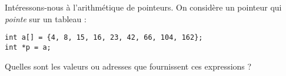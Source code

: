 \documentclass[french,a4paper,addpoints,11pt]{exam}
\begin{document}
\begin{questions}
\clearpage
\question Intéressons-nous à l'arithmétique de pointeurs. On considère  un pointeur qui \emph{pointe} sur un tableau :

\begin{lstlisting}
int a[] = {4, 8, 15, 16, 23, 42, 66, 104, 162};
int *p = a;
\end{lstlisting}

Quelles sont les valeurs ou adresses que fournissent ces expressions ?

\end{questions}
\end{document}
